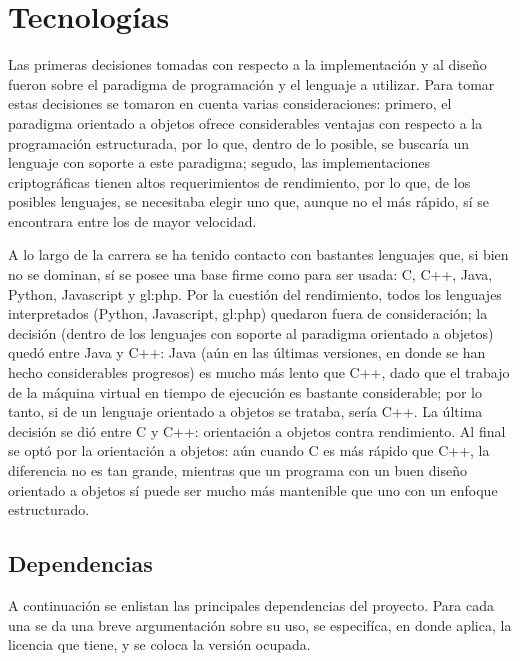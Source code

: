 %
%
%

\section{Tecnologías}
\label{sec:tecnologias}

Las primeras decisiones tomadas con respecto a la implementación y al diseño
fueron sobre el paradigma de programación y el lenguaje a utilizar. Para
tomar estas decisiones se tomaron en cuenta varias consideraciones: primero,
el paradigma orientado a objetos ofrece considerables ventajas con respecto
a la programación estructurada, por lo que, dentro de lo posible, se buscaría
un lenguaje con soporte a este paradigma; segudo, las implementaciones
criptográficas tienen altos requerimientos de rendimiento, por lo que, de los
posibles lenguajes, se necesitaba elegir uno que, aunque no el más rápido,
sí se encontrara entre los de mayor velocidad.

A lo largo de la carrera se ha tenido contacto con bastantes lenguajes que,
si bien no se dominan, sí se posee una base firme como para ser usada: C, C++,
Java, Python, Javascript y \acrshort{gl:php}. Por la cuestión del rendimiento,
todos los lenguajes interpretados (Python, Javascript, \acrshort{gl:php})
quedaron fuera de consideración; la decisión (dentro de los lenguajes con
soporte al paradigma orientado a objetos) quedó entre Java y C++: Java (aún en
las últimas versiones, en donde se han hecho considerables progresos) es mucho
más lento que C++, dado que el trabajo de la máquina virtual en tiempo de
ejecución es bastante considerable; por lo tanto, si de un lenguaje orientado a
objetos se trataba, sería C++. La última decisión se dió entre C y C++:
orientación a objetos contra rendimiento. Al final se optó por la orientación a
objetos: aún cuando C es más rápido que C++, la diferencia no es tan grande,
mientras que un programa con un buen diseño orientado a objetos sí puede ser
mucho más mantenible que uno con un enfoque estructurado.

\subsection{Dependencias}

A continuación se enlistan las principales dependencias del proyecto. Para
cada una se da una breve argumentación sobre su uso, se especifíca, en donde
aplica, la licencia que tiene, y se coloca la versión ocupada.

